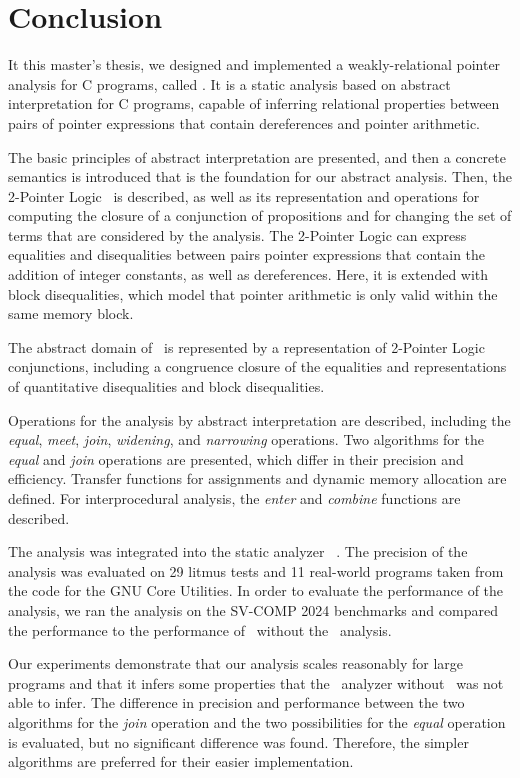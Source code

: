 \chapter{Conclusion}\label{chapter:conclusion}

It this master's thesis, we designed and implemented a weakly-relational pointer analysis for C programs, called \cpo.
It is a static analysis based on abstract interpretation for C programs,
capable of inferring relational properties between pairs of pointer expressions that contain dereferences and pointer arithmetic.

The basic principles of abstract interpretation are presented, and then a concrete semantics is introduced that is the foundation for our abstract analysis.
Then, the 2-Pointer Logic~\cite{2pointer} is described, as well as its representation and operations for computing the closure of a conjunction of propositions and for changing the set of terms that are considered by the analysis.
The 2-Pointer Logic can express equalities and disequalities between pairs pointer expressions that contain the addition of integer constants, as well as dereferences.
Here, it is extended with block disequalities, which model that pointer arithmetic is only valid within the same memory block.

The abstract domain of \cpo\ is represented by a representation of 2-Pointer Logic conjunctions, including a congruence closure of the equalities and representations of quantitative disequalities and block disequalities.

Operations for the analysis by abstract interpretation are described, including the \emph{equal}, \emph{meet}, \emph{join}, \emph{widening}, and \emph{narrowing} operations.
Two algorithms for the \emph{equal} and \emph{join} operations are presented, which differ in their precision and efficiency.
Transfer functions for assignments and dynamic memory allocation are defined.
For interprocedural analysis, the \emph{enter} and \emph{combine} functions are described.

The analysis was integrated into the static analyzer \goblint~\cite{goblint}.
The precision of the analysis was evaluated on 29 litmus tests and 11 real-world programs taken from the code for the GNU Core Utilities.
In order to evaluate the performance of the analysis, we ran the analysis on the SV-COMP 2024 benchmarks and compared the performance to the performance of \goblint\ without the \cpo\ analysis.

Our experiments demonstrate that our analysis scales reasonably for large programs and
that it infers some properties that the \goblint\ analyzer without \cpo\ was not able to infer.
The difference in precision and performance between the two algorithms for the \emph{join} operation and the two possibilities for the \emph{equal} operation is evaluated,
but no significant difference was found.
Therefore, the simpler algorithms are preferred for their easier implementation.

